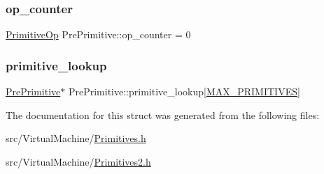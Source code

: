 \subsubsection{\texorpdfstring{op\+\_\+counter}{op\_counter}}
{\footnotesize\ttfamily \hyperlink{_instruction_8h_a227278394efd1e2313c727102db09ea9}{Primitive\+Op} Pre\+Primitive\+::op\+\_\+counter = 0\hspace{0.3cm}{\ttfamily [static]}}

\mbox{\label{struct_pre_primitive_a286cab59ea91d634e75f435cd9812dd1}} 
\subsubsection{\texorpdfstring{primitive\+\_\+lookup}{primitive\_lookup}}
{\footnotesize\ttfamily \hyperlink{struct_pre_primitive}{Pre\+Primitive}$\ast$ Pre\+Primitive\+::primitive\+\_\+lookup\mbox{[}\hyperlink{struct_pre_primitive_aaa931d0f215c4a79ab4920c13a82a32b}{M\+A\+X\+\_\+\+P\+R\+I\+M\+I\+T\+I\+V\+ES}\mbox{]}\hspace{0.3cm}{\ttfamily [static]}}



The documentation for this struct was generated from the following files\+:\begin{DoxyCompactItemize}
\item 
src/\+Virtual\+Machine/\hyperlink{_primitives_8h}{Primitives.\+h}\item 
src/\+Virtual\+Machine/\hyperlink{_primitives2_8h}{Primitives2.\+h}\end{DoxyCompactItemize}
